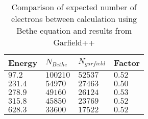 \begin{table}[ht]%
	\centering
	\caption[Comparison of expected number of electrons between calculation using Bethe equation and results from Garfield++.]
	{Comparison of expected number of electrons between calculation using Bethe equation and results from Garfield++}
	\label{chap3:GarfieldBethe}
	\begin{tabular}{llll}
		\toprule
		Energy    & \(N_{Bethe}\) & \(N_{garfield}\) & Factor \\
		\midrule
		\(97.2\)  & \(100210\)    & \(52537\)             & \(0.52\)   \\
		\(231.4\) & \(54970\)     & \(27463\)             & \(0.50\)   \\
		\(278.9\) & \(49160\)     & \(26124\)             & \(0.53\)   \\
		\(315.8\) & \(45850\)     & \(23769\)             & \(0.52\)   \\
		\(628.3\) & \(33600\)     & \(17522\)             & \(0.52\)   \\
		\bottomrule
	\end{tabular}
\end{table}